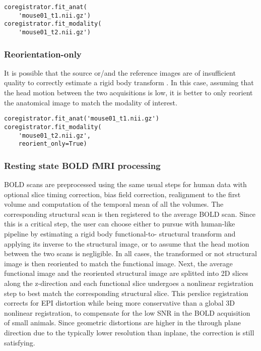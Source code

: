 \documentclass[utf8, a4paper, final, crop]{frontiersSCNS}
\begin{document}
\begin{verbatim}
coregistrator.fit_anat(
    'mouse01_t1.nii.gz')
coregistrator.fit_modality(
    'mouse01_t2.nii.gz')
\end{verbatim}
\subsubsection{Reorientation-only}

It is possible that the source or/and the reference
images are of insufficient quality to correctly estimate a rigid body transform
. In this case,
assuming that the head motion between the two acquisitions is low, it is better
to only reorient the anatomical image to match the modality of interest.
\begin{verbatim}
coregistrator.fit_anat('mouse01_t1.nii.gz')
coregistrator.fit_modality(
    'mouse01_t2.nii.gz',
    reorient_only=True)
\end{verbatim}

\subsubsection{Resting state BOLD fMRI processing}

BOLD scans are preprocessed using the same usual steps for human data
with optional slice timing correction, bias field correction, realignment to the 
first volume
and computation of the temporal mean of all the volumes.
The corresponding structural scan is then registered to the average BOLD scan.
Since this is a critical step, the user can choose
either to pursue with human-like pipeline by estimating a rigid body functional-to-
structural transform and applying its inverse to the structural image, or to assume 
that the head motion between the two scans is negligible.
In all cases, the transformed or not structural image is then reoriented
to match the functional image. Next, the average functional image and
the reoriented structural image are
splitted into 2D slices along the z-direction and each functional slice undergoes
 a nonlinear registration step to best match the corresponding structural slice.
This perslice registration corrects for EPI distortion while being more conservative 
than a global 3D nonlinear registration, to compensate for the low SNR in the BOLD acquisition of small animals.
Since geometric distortions are higher in the through plane direction due to the typically lower resolution than inplane, the correction is still satisfying.
\end{document}

